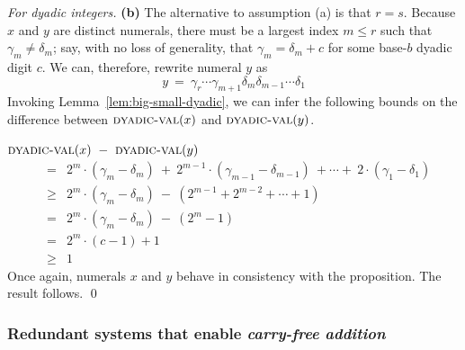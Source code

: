 \begin{proof}[For dyadic integers]
{\bf (b)} The alternative to assumption (a) is that $r = s$.  Because
$x$ and $y$ are distinct numerals, there must be a largest index $m
\leq r$ such that $\gamma_m \neq \delta_m$; say, with no loss of
generality, that $\gamma_m = \delta_m + c$ for some base-$b$ dyadic
digit $c$.  We can, therefore, rewrite numeral $y$ as
\[ y \ = \ \gamma_r \cdots \gamma_{m+1} \delta_m \delta_{m-1} \cdots \delta_1
\]
Invoking Lemma~\ref{lem:big-small-dyadic}, we can infer the following
bounds on the difference between $\mbox{\sc dyadic-val}(x)$ and
$\mbox{\sc dyadic-val}(y)$.

\bigskip

$\mbox{\sc dyadic-val}(x) \ - \ \mbox{\sc dyadic-val}(y)$
\begin{eqnarray*}
  & =  &
2^m \cdot (\gamma_m - \delta_m) \ + \ 2^{m-1} \cdot (\gamma_{m-1} -
\delta_{m-1}) \ + \cdots + \  2 \cdot (\gamma_1 - \delta_1) \\
  & \geq &
2^m \cdot (\gamma_m - \delta_m) \ - \ \left( 2^{m-1} + 2^{m-2} +
\cdots + 1 \right) \\
  & = &
2^m \cdot (\gamma_m - \delta_m)\ - \ \left( 2^m -1 \right) \\
  & = &
2^m \cdot (c-1) +1 \\
  & \geq & 1
\end{eqnarray*}
Once again, numerals $x$ and $y$ behave in consistency with the
proposition.  The result follows.
\qed
\end{proof}


\subsubsection{Redundant systems that enable {\em carry-free addition}}
\label{sec:carry-free}

